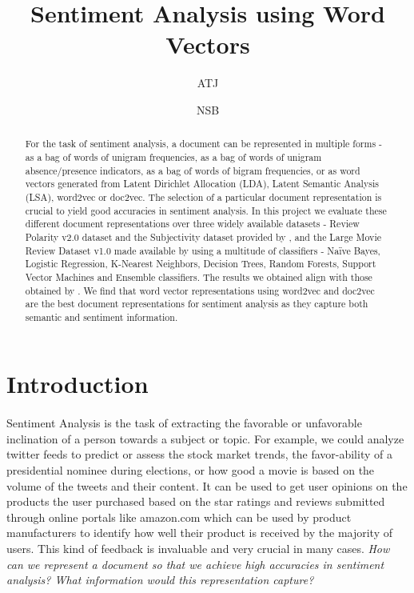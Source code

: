 \documentclass[a4paper,26pt]{article}
\title{Sentiment Analysis using Word Vectors}
\author{ATJ}
\author{NSB}
\affil{University of Massachusetts, Amherst}
\date{}
\begin{document}
\maketitle



\begin{abstract}

For the task of sentiment analysis, a document can be represented in multiple forms - as a bag of words of unigram frequencies, as a bag of words of unigram absence/presence indicators, as a bag of words of bigram frequencies, or as word vectors generated from Latent Dirichlet Allocation (LDA), Latent Semantic Analysis (LSA), word2vec or doc2vec. The selection of a particular document representation is crucial to yield good accuracies in sentiment analysis. In this project we evaluate these different document representations over three widely available datasets - Review Polarity v2.0 dataset and the Subjectivity dataset provided by \cite{pang2004sentimental}, and the Large Movie Review Dataset v1.0 made available by \cite{maas2011learning} using a multitude of classifiers - Naïve Bayes, Logistic Regression, K-Nearest Neighbors, Decision Trees, Random Forests, Support Vector Machines and Ensemble classifiers. The results we obtained align with those obtained by \cite{maas2011learning}. We find that word vector representations using word2vec and doc2vec are the best document representations for sentiment analysis as they capture both semantic and sentiment information. 

\end{abstract}

\section{Introduction}

\paragraph{}

Sentiment Analysis is the task of extracting the favorable or unfavorable inclination of a person towards a subject or topic. For example, we could analyze twitter feeds to predict or assess the stock market trends, the favor-ability of a presidential nominee during elections, or how good a movie is based on the volume of the tweets and their content. It can be used to get user opinions on the products the user purchased based on the star ratings and reviews submitted through online portals like amazon.com which can be used by product manufacturers to identify how well their product is received by the majority of users. This kind of feedback is invaluable and very crucial in many cases. \textit{How can we represent a document so that we achieve high accuracies in sentiment analysis? What information would this representation capture?}
\end{document}
